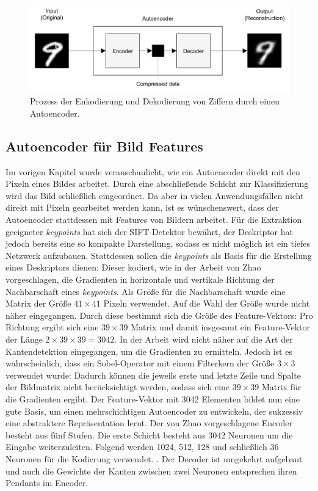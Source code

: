 \begin{figure}
	\centering
	\includegraphics[scale=0.55]{images/ae_mnist.png}
	\caption{Prozess der Enkodierung und Dekodierung von Ziffern durch einen Autoencoder.}
	\label{img:ae_mnist}
\end{figure}

\subsection{Autoencoder für Bild Features}

Im vorigen Kapitel wurde veranschaulicht, wie ein Autoencoder direkt mit den Pixeln eines Bildes arbeitet. Durch eine abschließende Schicht zur Klassifizierung wird das Bild schließlich eingeordnet. Da aber in vielen Anwendungsfällen nicht direkt mit Pixeln gearbeitet werden kann, ist es wünschenswert, dass der Autoencoder stattdessen mit Features von Bildern arbeitet. Für die Extraktion geeigneter \textit{keypoints} hat sich der SIFT-Detektor bewährt, der Deskriptor hat jedoch bereits eine so kompakte Darstellung, sodass es nicht möglich ist ein tiefes Netzwerk aufzubauen. Stattdessen sollen die \textit{keypoints} als Basis für die Erstellung eines Deskriptors dienen: Dieser kodiert, wie in der Arbeit von Zhao \cite{aed2016} vorgeschlagen, die Gradienten in horizontale und vertikale Richtung der Nachbarschaft eines \textit{keypoints}. Als Größe für die Nachbarschaft wurde eine Matrix der Größe $41 \times 41$ Pixeln verwendet. Auf die Wahl der Größe wurde nicht näher eingegangen. Durch diese bestimmt sich die Größe des Feature-Vektors: Pro Richtung ergibt sich eine $39 \times 39$ Matrix und damit insgesamt ein Feature-Vektor der Länge $2 \times 39 \times 39 = 3042$. In der Arbeit wird nicht näher auf die Art der Kantendetektion eingegangen, um die Gradienten zu ermitteln. Jedoch ist es wahrscheinlich, dass ein Sobel-Operator mit einem Filterkern der Größe $3 \times 3$ verwendet wurde: Dadurch können die jeweils erste und letzte Zeile und Spalte der Bildmatrix nicht berücksichtigt werden, sodass sich eine $39 \times 39$ Matrix für die Gradienten ergibt.
Der Feature-Vektor mit 3042 Elementen bildet nun eine gute Basis, um einen mehrschichtigen Autoencoder zu entwickeln, der sukzessiv eine abstraktere Repräsentation lernt. Der von Zhao vorgeschlagene Encoder besteht aus fünf Stufen. Die erste Schicht besteht aus 3042 Neuronen um die Eingabe weiterzuleiten. Folgend werden 1024, 512, 128 und schließlich 36 Neuronen für die Kodierung verwendet. . Der Decoder ist umgekehrt aufgebaut und auch die Gewichte der Kanten zwischen zwei Neuronen entsprechen ihren Pendants im Encoder.